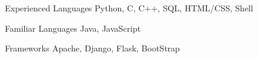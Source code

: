 

\begin{cvskills}

  \cvskill
  {Experienced Languages} %
  {Python, C, C++, SQL, HTML/CSS, Shell} %

  \cvskill
  {Familiar Languages} %
  {Java, JavaScript} %

  \cvskill
  {Frameworks} %
  {Apache, Django, Flask, BootStrap} %


\end{cvskills}
